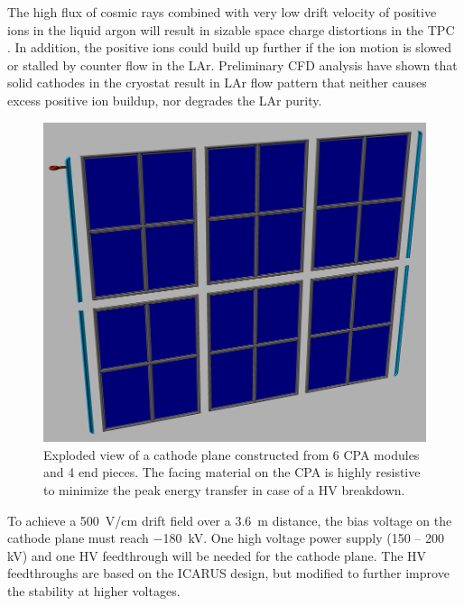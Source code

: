 
The high flux of cosmic rays combined with very low drift velocity of positive ions in the liquid argon will result in sizable space charge distortions in the TPC \cite{spacecharge}.  In addition, the positive ions could build up further if the ion motion is slowed or stalled by counter flow in the LAr.  Preliminary CFD analysis \cite{CFD} have shown that solid cathodes in the cryostat result in LAr flow pattern that neither causes excess positive ion buildup, nor degrades the LAr purity.


\begin{figure}[t]
\centering
\includegraphics[width=5in]{figures/TPC_CPA_1}
\caption{Exploded view of a cathode plane constructed from 6 CPA modules and 4 end pieces. The facing material on the CPA is highly resistive to minimize the peak energy transfer in case of a HV breakdown.}
\label{fig:tpc_cpa_1}
\end{figure}

To achieve a 500~V/cm drift field over a 3.6~m distance, the bias 
voltage on the cathode plane must reach $-$180~kV. One high voltage power supply (150 -- 200 kV) and one HV feedthrough will be needed for the cathode plane.  The HV feedthroughs are based on the ICARUS design, but modified to further improve the stability at higher voltages. %

